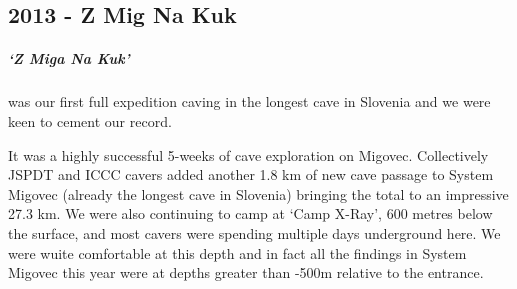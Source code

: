 \begin{tcolorbox}
	\chapter{2013 - Z Mig Na Kuk}
	\paragraph{‘Z Miga Na Kuk’} was our first full expedition caving in the longest cave in Slovenia and we were keen to cement our record. 
    
It was a highly successful 5-weeks of cave exploration on Migovec. Collectively JSPDT and ICCC cavers added another 1.8 km of new cave passage to System Migovec (already the longest cave in Slovenia) bringing the total to an impressive 27.3 km. We were also continuing to camp at ‘Camp X-Ray’, 600 metres below the surface, and most cavers were spending multiple days underground here. We were wuite comfortable at this depth and in fact all the findings in System Migovec this year were at depths greater than -500m relative to the entrance.
	\\
	\\
	\\
\end{tcolorbox}
\BgThispage
